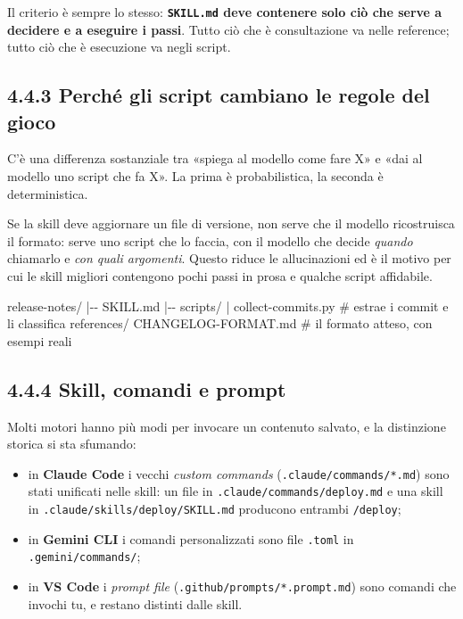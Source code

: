 \documentclass[
  italian,
  10pt,
]{book}
\newenvironment{Shaded}{\begin{snugshade}}{\end{snugshade}}
\newcommand{\NormalTok}[1]{#1}
\providecommand{\tightlist}{%
  \setlength{\itemsep}{0pt}\setlength{\parskip}{0pt}}
\begin{document}
Il criterio è sempre lo stesso: \textbf{\texttt{SKILL.md} deve contenere
solo ciò che serve a decidere e a eseguire i passi}. Tutto ciò che è
consultazione va nelle reference; tutto ciò che è esecuzione va negli
script.

\subsection{4.4.3 Perché gli script cambiano le regole del
gioco}\label{perchuxe9-gli-script-cambiano-le-regole-del-gioco}

C'è una differenza sostanziale tra «spiega al modello come fare X» e
«dai al modello uno script che fa X». La prima è probabilistica, la
seconda è deterministica.

Se la skill deve aggiornare un file di versione, non serve che il
modello ricostruisca il formato: serve uno script che lo faccia, con il
modello che decide \emph{quando} chiamarlo e \emph{con quali argomenti}.
Questo riduce le allucinazioni ed è il motivo per cui le skill migliori
contengono pochi passi in prosa e qualche script affidabile.

\begin{Shaded}
\begin{Highlighting}[]
\NormalTok{release{-}notes/}
\NormalTok{|{-}{-} SKILL.md}
\NormalTok{|{-}{-} scripts/}
\NormalTok{|   \textasciigrave{}{-}{-} collect{-}commits.py     \# estrae i commit e li classifica}
\NormalTok{\textasciigrave{}{-}{-} references/}
\NormalTok{    \textasciigrave{}{-}{-} CHANGELOG{-}FORMAT.md    \# il formato atteso, con esempi reali}
\end{Highlighting}
\end{Shaded}

\subsection{4.4.4 Skill, comandi e prompt}\label{skill-comandi-e-prompt}

Molti motori hanno più modi per invocare un contenuto salvato, e la
distinzione storica si sta sfumando:

\begin{itemize}
\tightlist
\item
  in \textbf{Claude Code} i vecchi \emph{custom commands}
  (\texttt{.claude/commands/*.md}) sono stati unificati nelle skill: un
  file in \texttt{.claude/commands/deploy.md} e una skill in
  \texttt{.claude/skills/deploy/SKILL.md} producono entrambi
  \texttt{/deploy};
\item
  in \textbf{Gemini CLI} i comandi personalizzati sono file
  \texttt{.toml} in \texttt{.gemini/commands/};
\item
  in \textbf{VS Code} i \emph{prompt file}
  (\texttt{.github/prompts/*.prompt.md}) sono comandi che invochi tu, e
  restano distinti dalle skill.
\end{itemize}
\end{document}
